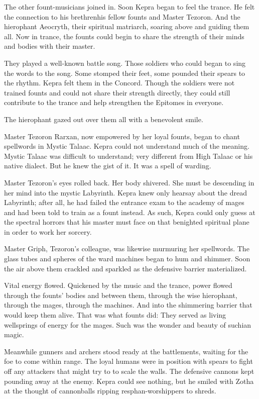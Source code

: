 \documentclass
  [a4paper,
   12pt,
   oneside
  ]%
  {article}
\begin{document}
The other fount-musicians joined in. 
Soon Kepra began to feel the trance. 
He felt the connection to his brethren\dash{}his fellow founts and Master Tezoron. And the hierophant Aeocryth, their spiritual matriarch, soaring above and guiding them all. 
Now in trance, the founts could begin to share the strength of their minds and bodies with their master.

They played a well-known battle song. 
Those soldiers who could began to sing the words to the song. Some stomped their feet, some pounded their spears to the rhythm. Kepra felt them in the Concord. Though the soldiers were not trained founts and could not share their strength directly, they could still contribute to the trance and help strengthen the Epitomes in everyone.

The hierophant gazed out over them all with a benevolent smile.

Master Tezoron Rarxan, now empowered by her loyal founts, began to chant spellwords in Mystic Talaac. 
Kepra could not understand much of the meaning. Mystic Talaac was difficult to understand; very different from High Talaac or his native dialect.
But he knew the gist of it. It was a spell of warding. 

Master Tezoron’s eyes rolled back. Her body shivered. She must be descending in her mind into the mystic Labyrinth. Kepra knew only hearsay about the dread Labyrinth; after all, he had failed the entrance exam to the academy of mages and had been told to train as a fount instead. 
As such, Kepra could only guess at the spectral horrors that his master must face on that benighted spiritual plane in order to work her sorcery. 

Master Griph, Tezoron's colleague, was likewise murmuring her spellwords. 
The glass tubes and spheres of the ward machines began to hum and shimmer. Soon the air above them crackled and sparkled as the defensive barrier materialized.

Vital energy flowed. 
Quickened by the music and the trance, power flowed through the founts' bodies and between them, through the wise hierophant, through the mages, through the machines. And into the shimmering barrier that would keep them alive. 
That was what founts did: They served as living wellsprings of energy for the mages.
Such was the wonder and beauty of suchian magic.

Meanwhile gunners and archers stood ready at the battlements, waiting for the foe to come within range. 
The loyal humans were in position with spears to fight off any attackers that might try to to scale the walls. 
The defensive cannons kept pounding away at the enemy. Kepra could see nothing, but he smiled with Zotha at the thought of cannonballs ripping resphan-worshippers to shreds.
\end{document}
